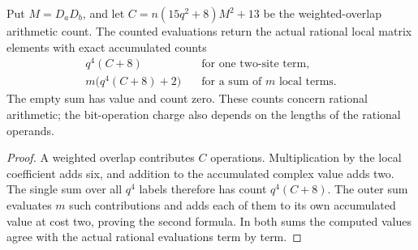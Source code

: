 \begin{lemma}
    \label{lem:lvv_local_matrix_element_arithmetic_count}
    \leanok
    Put $M=D_aD_b$, and let
    $C=n(15q^2+8)M^2+13$ be the weighted-overlap arithmetic count.
    The counted evaluations return the actual rational local matrix
    elements with exact accumulated counts
    \begin{align*}
        q^4(C+8)                & \quad\text{for one two-site term},        \\
        m\bigl(q^4(C+8)+2\bigr) & \quad\text{for a sum of $m$ local terms}.
    \end{align*}
    The empty sum has value and count zero.
    These counts concern rational arithmetic; the bit-operation charge
    also depends on the lengths of the rational operands.
\end{lemma}
\begin{proof}\leanok
    A weighted overlap contributes $C$ operations. Multiplication by
    the local coefficient adds six, and addition to the accumulated
    complex value adds two. The single sum over all $q^4$ labels
    therefore has count $q^4(C+8)$.
    The outer sum evaluates $m$ such contributions and adds each of
    them to its own accumulated value at cost two, proving the second
    formula. In both sums the computed values agree with the actual
    rational evaluations term by term.
\end{proof}

